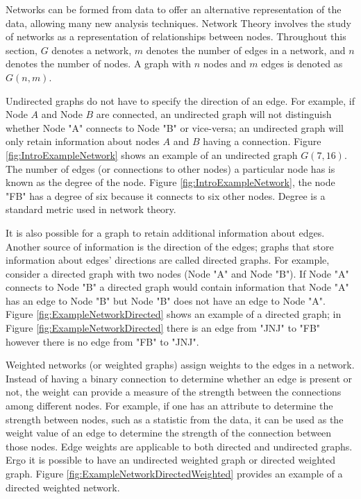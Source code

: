 Networks can be formed from data to offer an alternative representation of the data, allowing many new analysis techniques. Network Theory involves the study of networks as a representation of relationships between nodes. Throughout this section, \(G\) denotes a network, \(m\) denotes the number of edges in a network, and \(n\) denotes the number of nodes.  A graph with \(n\) nodes and \(m\) edges is denoted as \(G(n,m)\).

Undirected graphs do not have to specify the direction of an edge.  For example, if Node \(A\) and Node \(B\) are connected, an undirected graph will not distinguish whether Node "A" connects to Node "B" or vice-versa;  an undirected graph will only retain information about nodes \(A\) and \(B\) having a connection. Figure \ref{fig:IntroExampleNetwork} shows an example of an undirected graph \(G(7,16)\). The number of edges (or connections to other nodes) a particular node has is known as the degree of the node. Figure \ref{fig:IntroExampleNetwork}, the node "FB" has a degree of six because it connects to six other nodes. Degree is a standard metric used in network theory.

It is also possible for a graph to retain additional information about edges. Another source of information is the direction of the edges; graphs that store information about edges' directions are called directed graphs.  For example,  consider a directed graph with two nodes (Node "A" and Node "B"). If Node "A"  connects to Node "B" a directed graph would contain information that Node "A"  has an edge to Node "B" but Node "B" does not have an edge to Node "A".  Figure \ref{fig:ExampleNetworkDirected} shows an example of a directed graph; in Figure \ref{fig:ExampleNetworkDirected} there is an edge from "JNJ" to "FB"  however there is no edge from "FB" to "JNJ".

Weighted networks (or weighted graphs) assign weights to the edges in a network. Instead of having a binary connection to determine whether an edge is present or not, the weight can provide a measure of the strength between the connections among different nodes. For example, if one has an attribute to determine the strength between nodes, such as a statistic from the data,  it can be used as the weight value of an edge to determine the strength of the connection between those nodes.  Edge weights are applicable to both directed and undirected graphs. Ergo it is possible to have an undirected weighted graph or directed weighted graph. Figure \ref{fig:ExampleNetworkDirectedWeighted} provides an example of a directed weighted network. 

